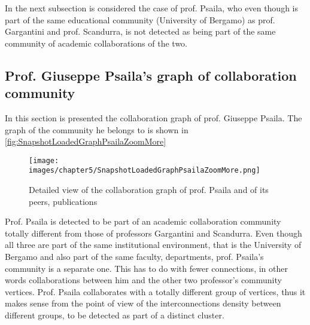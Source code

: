 In the next subsection is considered the case of prof. Psaila, who even though is part of the same educational community (University of Bergamo) as prof. Gargantini and prof. Scandurra, is not detected as being part of the same community of academic collaborations of the two.

\subsection{Prof. Giuseppe Psaila's graph of collaboration community} \label{subsection:Displayoftheresults/Indetailviewofthecollaborationgraph/ProfGiuseppePsailasgraphofcollaborationcommunity}
In this section is presented the collaboration graph of prof. Giuseppe Psaila. The graph of the community he belongs to is shown in \hyperref[fig:SnapshotLoadedGraphPsailaZoomMore]{\autoref{fig:SnapshotLoadedGraphPsailaZoomMore}}

\begin{figure}[H]%
	\centering%
	\texttt{[image: images/chapter5/SnapshotLoadedGraphPsailaZoomMore.png]}%
	\caption[Detailed view of the collaboration graph of prof. Psaila and of its peers, publications]{Detailed view of the collaboration graph of prof. Psaila and of its peers, publications}%
	\label{fig:SnapshotLoadedGraphPsailaZoomMore}%
\end{figure}%

Prof. Psaila is detected to be part of an academic collaboration community totally different from those of professors Gargantini and Scandurra.
Even though all three are part of the same institutional environment, that is the University of Bergamo and also part of the same faculty, departments, prof. Psaila's community is a separate one.
This has to do with fewer connections, in other words collaborations between him and the other two professor's community vertices.
Prof. Psaila collaborates with a totally different group of vertices, thus it makes sense from the point of view of the interconnections density between different groups, to be detected as part of a distinct cluster.

